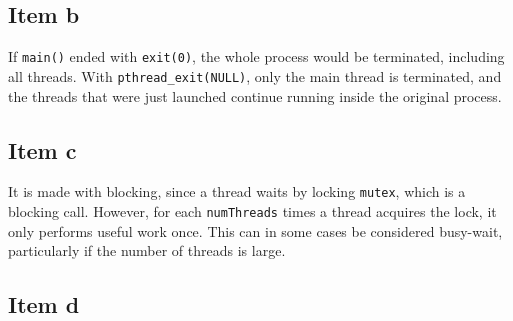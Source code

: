 {\subsection{Item b}
If \texttt{main()} ended with \texttt{exit(0)}, the whole process would be terminated, including all threads. With \texttt{pthread\_exit(NULL)}, only the main thread is terminated, and the threads that were just launched continue running inside the original process.

\subsection{Item c}
It is made with blocking, since a thread waits by locking \texttt{mutex}, which is a blocking call. However, for each \texttt{numThreads} times a thread acquires the lock, it only performs useful work once. This can in some cases be considered busy-wait, particularly if the number of threads is large.

\subsection{Item d}


}

